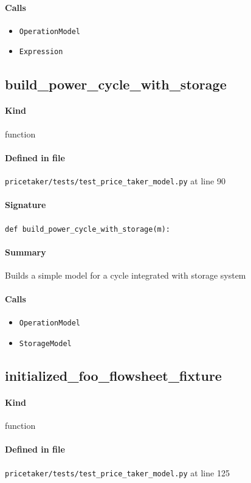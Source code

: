 \documentclass[11pt]{report}
\begin{document}
\paragraph{Calls}
\begin{itemize}[leftmargin=*]
  \item \texttt{OperationModel}
  \item \texttt{Expression}
\end{itemize}
\subsection{build\_power\_cycle\_with\_storage}
\label{def:pricetaker-tests-test_price_taker_model.py:build_power_cycle_with_storage:L90}
\paragraph{Kind} function
\paragraph{Defined in file} \texttt{pricetaker/tests/test\_price\_taker\_model.py} at line 90
\paragraph{Signature} \texttt{def build\_power\_cycle\_with\_storage(m):}
\paragraph{Summary} Builds a simple model for a cycle integrated with storage system
\paragraph{Calls}
\begin{itemize}[leftmargin=*]
  \item \texttt{OperationModel}
  \item \texttt{StorageModel}
\end{itemize}
\subsection{initialized\_foo\_flowsheet\_fixture}
\label{def:pricetaker-tests-test_price_taker_model.py:initialized_foo_flowsheet_fixture:L125}
\paragraph{Kind} function
\paragraph{Defined in file} \texttt{pricetaker/tests/test\_price\_taker\_model.py} at line 125
\end{document}
